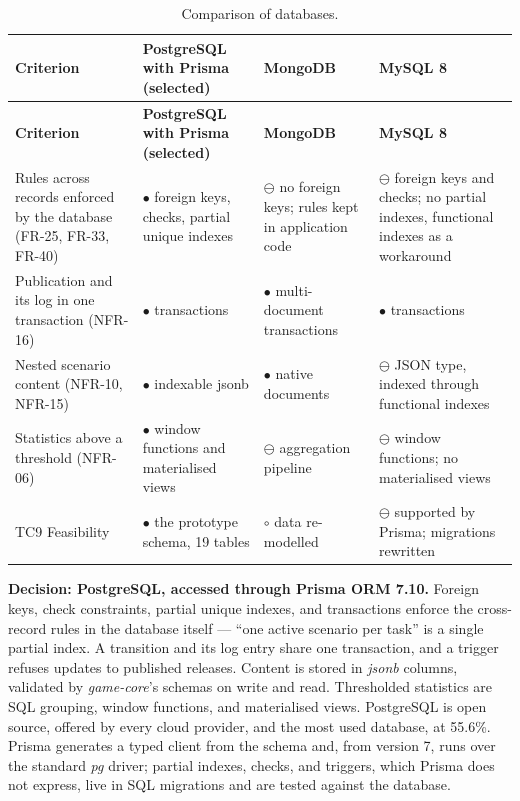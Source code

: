 {\small
\begin{longtable}{|>{\raggedright\arraybackslash}p{}|>{\raggedright\arraybackslash}p{}|>{\raggedright\arraybackslash}p{}|>{\raggedright\arraybackslash}p{}|}
\caption{Comparison of databases.} \\
\hline
\textbf{Criterion} & \textbf{PostgreSQL with Prisma (selected)} & \textbf{MongoDB\cite{r182}} & \textbf{MySQL 8\cite{r183}} \\ \hline
\endfirsthead
\hline
\textbf{Criterion} & \textbf{PostgreSQL with Prisma (selected)} & \textbf{MongoDB\cite{r182}} & \textbf{MySQL 8\cite{r183}} \\ \hline
\endhead
Rules across records enforced by the database (FR-25, FR-33, FR-40) & $\bullet$ foreign keys, checks, partial unique indexes\cite{r151} & $\ominus$ no foreign keys; rules kept in application code & $\ominus$ foreign keys and checks; no partial indexes, functional indexes as a workaround \\ \hline
Publication and its log in one transaction (NFR-16) & $\bullet$ transactions & $\bullet$ multi-document transactions\cite{r182} & $\bullet$ transactions \\ \hline
Nested scenario content (NFR-10, NFR-15) & $\bullet$ indexable jsonb\cite{r152} & $\bullet$ native documents & $\ominus$ JSON type, indexed through functional indexes \\ \hline
Statistics above a threshold (NFR-06) & $\bullet$ window functions and materialised views & $\ominus$ aggregation pipeline & $\ominus$ window functions; no materialised views \\ \hline
TC9 Feasibility & $\bullet$ the prototype schema, 19 tables & $\circ$ data re-modelled & $\ominus$ supported by Prisma; migrations rewritten \\ \hline
\end{longtable}
}

\textbf{Decision: PostgreSQL, accessed through Prisma ORM 7.10.} Foreign keys, check constraints, partial unique indexes, and transactions enforce the cross-record rules in the database itself --- ``one active scenario per task'' is a single partial index\cite{r151}. A transition and its log entry share one transaction, and a trigger refuses updates to published releases. Content is stored in \textit{jsonb} columns\cite{r152}, validated by \textit{game-core}'s schemas on write and read. Thresholded statistics are SQL grouping, window functions, and materialised views. PostgreSQL is open source, offered by every cloud provider, and the most used database, at 55.6\%\cite{r134}. Prisma generates a typed client from the schema and, from version 7, runs over the standard \textit{pg} driver\cite{r153}; partial indexes, checks, and triggers, which Prisma does not express, live in SQL migrations and are tested against the database.

